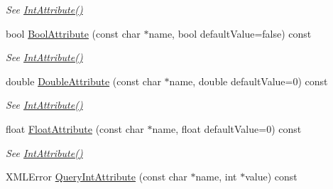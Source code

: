 \begin{DoxyCompactItemize}
\begin{DoxyCompactList}\small\item\em See \hyperlink{classtinyxml2_1_1_x_m_l_element_a95a89b13bb14a2d4655e2b5b406c00d4}{Int\+Attribute()} \end{DoxyCompactList}\item 
\mbox{\label{classtinyxml2_1_1_x_m_l_element_a53eda26131e1ad1031ef8ec8adb51bd8}} 
bool \hyperlink{classtinyxml2_1_1_x_m_l_element_a53eda26131e1ad1031ef8ec8adb51bd8}{Bool\+Attribute} (const char $\ast$name, bool default\+Value=false) const
\begin{DoxyCompactList}\small\item\em See \hyperlink{classtinyxml2_1_1_x_m_l_element_a95a89b13bb14a2d4655e2b5b406c00d4}{Int\+Attribute()} \end{DoxyCompactList}\item 
\mbox{\label{classtinyxml2_1_1_x_m_l_element_a10a90c505aea716bf073eea1c97f33b5}} 
double \hyperlink{classtinyxml2_1_1_x_m_l_element_a10a90c505aea716bf073eea1c97f33b5}{Double\+Attribute} (const char $\ast$name, double default\+Value=0) const
\begin{DoxyCompactList}\small\item\em See \hyperlink{classtinyxml2_1_1_x_m_l_element_a95a89b13bb14a2d4655e2b5b406c00d4}{Int\+Attribute()} \end{DoxyCompactList}\item 
\mbox{\label{classtinyxml2_1_1_x_m_l_element_ab1f4be2332e27dc640e9b6abd01d64dd}} 
float \hyperlink{classtinyxml2_1_1_x_m_l_element_ab1f4be2332e27dc640e9b6abd01d64dd}{Float\+Attribute} (const char $\ast$name, float default\+Value=0) const
\begin{DoxyCompactList}\small\item\em See \hyperlink{classtinyxml2_1_1_x_m_l_element_a95a89b13bb14a2d4655e2b5b406c00d4}{Int\+Attribute()} \end{DoxyCompactList}\item 
X\+M\+L\+Error \hyperlink{classtinyxml2_1_1_x_m_l_element_a8a78bc1187c1c45ad89f2690eab567b1}{Query\+Int\+Attribute} (const char $\ast$name, int $\ast$value) const
\item 
\mbox{\label{classtinyxml2_1_1_x_m_l_element_a26fc84cbfba6769dafcfbf256c05e22f}} 

\end{DoxyCompactItemize}
